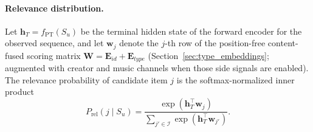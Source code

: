 \paragraph{Relevance distribution.}
Let $\mathbf{h}_T = f_{\mathrm{PT}}(S_u)$ be the terminal hidden state of the forward encoder for the observed sequence, and let $\mathbf{w}_j$ denote the $j$-th row of the position-free content-fused scoring matrix $\mathbf{W} = \mathbf{E}_{id} + \mathbf{E}_{type}$ (Section~\ref{sec:type_embeddings}; augmented with creator and music channels when those side signals are enabled). The relevance probability of candidate item $j$ is the softmax-normalized inner product
\begin{equation}
\label{eq:prel}
P_{\mathrm{rel}}(j \mid S_u)
 = \frac{\exp(\mathbf{h}_T^\top \mathbf{w}_j)}
        {\sum_{j' \in \mathcal{I}} \exp(\mathbf{h}_T^\top \mathbf{w}_{j'})}.
\end{equation}

